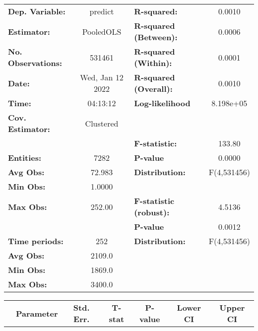 \begin{center}
\begin{tabular}{lclc}
\toprule
\textbf{Dep. Variable:}    &      predict       & \textbf{  R-squared:         }   &      0.0010      \\
\textbf{Estimator:}        &     PooledOLS      & \textbf{  R-squared (Between):}  &      0.0006      \\
\textbf{No. Observations:} &       531461       & \textbf{  R-squared (Within):}   &      0.0001      \\
\textbf{Date:}             &  Wed, Jan 12 2022  & \textbf{  R-squared (Overall):}  &      0.0010      \\
\textbf{Time:}             &      04:13:12      & \textbf{  Log-likelihood     }   &    8.198e+05     \\
\textbf{Cov. Estimator:}   &     Clustered      & \textbf{                     }   &                  \\
\textbf{}                  &                    & \textbf{  F-statistic:       }   &      133.80      \\
\textbf{Entities:}         &        7282        & \textbf{  P-value            }   &      0.0000      \\
\textbf{Avg Obs:}          &       72.983       & \textbf{  Distribution:      }   &   F(4,531456)    \\
\textbf{Min Obs:}          &       1.0000       & \textbf{                     }   &                  \\
\textbf{Max Obs:}          &       252.00       & \textbf{  F-statistic (robust):} &      4.5136      \\
\textbf{}                  &                    & \textbf{  P-value            }   &      0.0012      \\
\textbf{Time periods:}     &        252         & \textbf{  Distribution:      }   &   F(4,531456)    \\
\textbf{Avg Obs:}          &       2109.0       & \textbf{                     }   &                  \\
\textbf{Min Obs:}          &       1869.0       & \textbf{                     }   &                  \\
\textbf{Max Obs:}          &       3400.0       & \textbf{                     }   &                  \\
\bottomrule
\end{tabular}
\begin{tabular}{lcccccc}
                & \textbf{Parameter} & \textbf{Std. Err.} & \textbf{T-stat} & \textbf{P-value} & \textbf{Lower CI} & \textbf{Upper CI}  \\

\end{tabular}
\end{center}
